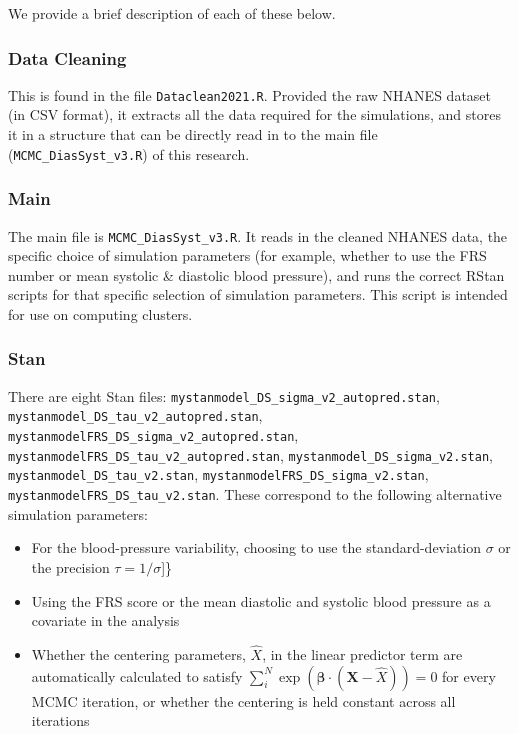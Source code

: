\documentclass[
]{article}
\providecommand{\tightlist}{%
  \setlength{\itemsep}{0pt}\setlength{\parskip}{0pt}}
\begin{document}
We provide a brief description of each of these below.

\hypertarget{data-cleaning}{%
\subsubsection{Data Cleaning}\label{data-cleaning}}

This is found in the file \texttt{Dataclean2021.R}. Provided the raw
NHANES dataset (in CSV format), it extracts all the data required for
the simulations, and stores it in a structure that can be directly read
in to the main file (\texttt{MCMC\_DiasSyst\_v3.R}) of this research.

\hypertarget{main}{%
\subsubsection{Main}\label{main}}

The main file is \texttt{MCMC\_DiasSyst\_v3.R}. It reads in the cleaned
NHANES data, the specific choice of simulation parameters (for example,
whether to use the FRS number or mean systolic \& diastolic blood
pressure), and runs the correct RStan scripts for that specific
selection of simulation parameters. This script is intended for use on
computing clusters.

\hypertarget{stan}{%
\subsubsection{Stan}\label{stan}}

There are eight Stan files:
\texttt{mystanmodel\_DS\_sigma\_v2\_autopred.stan},
\texttt{mystanmodel\_DS\_tau\_v2\_autopred.stan},
\texttt{mystanmodelFRS\_DS\_sigma\_v2\_autopred.stan},
\texttt{mystanmodelFRS\_DS\_tau\_v2\_autopred.stan},
\texttt{mystanmodel\_DS\_sigma\_v2.stan},
\texttt{mystanmodel\_DS\_tau\_v2.stan},
\texttt{mystanmodelFRS\_DS\_sigma\_v2.stan},
\texttt{mystanmodelFRS\_DS\_tau\_v2.stan}. These correspond to the
following alternative simulation parameters:

\begin{itemize}
\tightlist
\item
  For the blood-pressure variability, choosing to use the
  standard-deviation \(\sigma\) or the precision \(\tau=1/\sigma\){]}\}
\item
  Using the FRS score or the mean diastolic and systolic blood pressure
  as a covariate in the analysis
\item
  Whether the centering parameters, \(\hat{X}\), in the linear predictor
  term are automatically calculated to satisfy
  \(\sum_i^N \exp{(\boldsymbol{\beta}\cdot(\boldsymbol{X}-\hat{X}))}=0\)
  for every MCMC iteration, or whether the centering is held constant
  across all iterations
\end{itemize}
\end{document}
